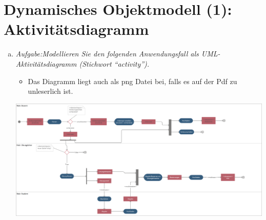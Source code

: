 \newpage
\section{Dynamisches Objektmodell (1): Aktivitätsdiagramm}
\begin{enumerate}[(a)]
    \item {\itshape Aufgabe:Modellieren Sie den folgenden Anwendungsfall als UML-Aktivitätsdiagramm (Stichwort “activity”).}
    \begin{itemize}
        \item Das Diagramm liegt auch als png Datei bei, falls es auf der Pdf zu unleserlich ist.
    \end{itemize}
    
    \begin{center}
        \includegraphics[angle=90,width=0.8\linewidth]{src/u6/U6_2.png}
    \end{center}

\end{enumerate}


